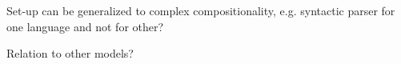 \documentclass[a4paper,11pt]{article}
\begin{document}
Set-up can be generalized to complex compositionality, e.g. syntactic parser for one language and not for other?

Relation to other models?










\end{document}
